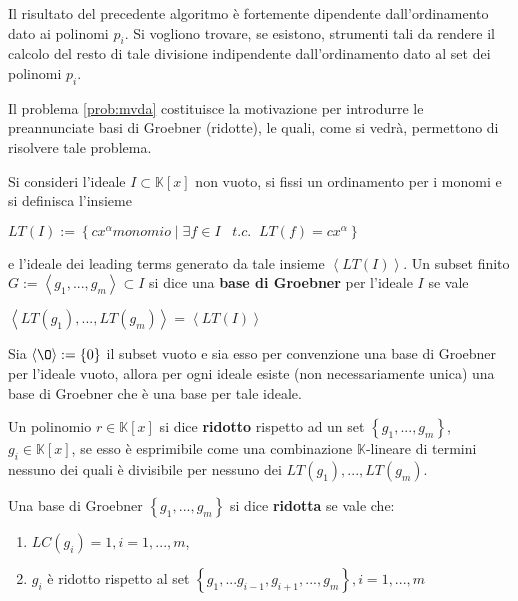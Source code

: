 \begin{prob}
	\label{prob:mvda}
	Il risultato del precedente algoritmo è fortemente dipendente dall'ordinamento dato ai polinomi $p_i$. Si vogliono trovare, se esistono, strumenti tali da rendere il calcolo del resto di tale divisione indipendente dall'ordinamento dato al set dei polinomi $p_i$.
\end{prob}

Il problema \ref{prob:mvda} costituisce la motivazione per introdurre le preannunciate basi di Groebner (ridotte), le quali, come si vedrà, permettono di risolvere tale problema.

\begin{defn}
	Si consideri l'ideale $I \subset \mathbb{K}[x]$ non vuoto, si fissi un ordinamento per i monomi e si definisca l'insieme
	\begin{center}
		$LT(I) := \left\lbrace cx^{\alpha} monomio \; | \; \exists f \in I \; \; \; t.c. \; \;  LT(f) = cx^{\alpha} \right\rbrace $
	\end{center} 
	e l'ideale dei leading terms generato da tale insieme $\left\langle LT(I) \right\rangle $.
	Un subset finito $G := \left\langle g_1, ..., g_m\right\rangle \subset I$ si dice una \textbf{base di Groebner} per l'ideale $I$ se vale
	\begin{center}
		$\left\langle LT(g_1), ..., LT(g_m) \right\rangle = \left\langle LT(I) \right\rangle$
	\end{center}
\end{defn}

\begin{prop}
	Sia $\left\langle \O \right\rangle := \{0\}$ il subset vuoto e sia esso per convenzione una base di Groebner per l'ideale vuoto, allora per ogni ideale esiste (non necessariamente unica) una base di Groebner che è una base per tale ideale.
\end{prop}

\begin{defn}
	Un polinomio $r \in \mathbb{K}[x]$ si dice \textbf{ridotto} rispetto ad un set $\left\lbrace g_1, ..., g_m \right\rbrace$, $g_i \in \mathbb{K}[x]$, se esso è esprimibile come una combinazione $\mathbb{K}$-lineare di termini nessuno dei quali è divisibile per nessuno dei $LT(g_1), ..., LT(g_m)$.
\end{defn}

\begin{defn}
	Una base di Groebner $\left\lbrace g_1, ..., g_m \right\rbrace$ si dice \textbf{ridotta} se vale che:
	\begin{enumerate}
		\item $LC(g_i) = 1, i = 1, ..., m$,
		\item $g_i$ è ridotto rispetto al set $\left\lbrace g_1, ...g_{i-1},g_{i+1}, ..., g_m \right\rbrace, i = 1, ..., m$
	\end{enumerate}
\end{defn}

